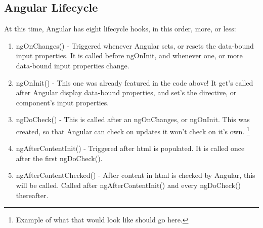 \subsection{ Angular Lifecycle }
At this time, Angular has eight lifecycle hooks, in this order, more, or less:
\begin{enumerate}
  \item ngOnChanges() - Triggered whenever Angular sets, or resets the data-bound
  input properties. It is called before ngOnInit, and whenever one, or more
  data-bound input properties change.
  \item ngOnInit() - This one was already featured in the code above! It get's
  called after Angular display data-bound properties, and set's the directive,
  or component's input properties.
  \item ngDoCheck() - This is called after an ngOnChanges, or ngOnInit. This
  was created, so that Angular can check on updates it won't check on it's own.
  \footnote{Example of what that would look like should go here.}
  \item ngAfterContentInit() - Triggered after html is populated. It is called
  once after the first ngDoCheck().
  \item ngAfterContentChecked() - After content in html is checked by Angular,
  this will be called. Called after ngAfterContentInit() and every ngDoCheck()
  thereafter. 

\end{enumerate}
